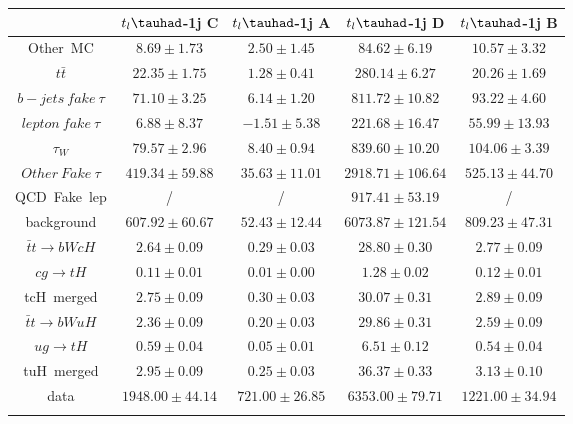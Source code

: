 \centering
\begin{tabular}{ccccc} \toprule\toprule
 & $t_{l}\tauhad$-1j C & $t_{l}\tauhad$-1j A & $t_{l}\tauhad$-1j D & $t_{l}\tauhad$-1j B\\\midrule
Other~MC & $8.69\pm1.73$ & $2.50\pm1.45$ & $84.62\pm6.19$ & $10.57\pm3.32$\\
$t\bar{t}$ & $22.35\pm1.75$ & $1.28\pm0.41$ & $280.14\pm6.27$ & $20.26\pm1.69$\\
$b-jets~fake~\tau$ & $71.10\pm3.25$ & $6.14\pm1.20$ & $811.72\pm10.82$ & $93.22\pm4.60$\\
$lepton~fake~\tau$ & $6.88\pm8.37$ & $-1.51\pm5.38$ & $221.68\pm16.47$ & $55.99\pm13.93$\\
$\tau_{W}$ & $79.57\pm2.96$ & $8.40\pm0.94$ & $839.60\pm10.20$ & $104.06\pm3.39$\\
$Other~Fake~\tau$ & $419.34\pm59.88$ & $35.63\pm11.01$ & $2918.71\pm106.64$ & $525.13\pm44.70$\\
QCD~Fake~lep &  / &  / & $917.41\pm53.19$ &  /\\
background & $607.92\pm60.67$ & $52.43\pm12.44$ & $6073.87\pm121.54$ & $809.23\pm47.31$\\\midrule
$\bar{t}t\to bWcH$ & $2.64\pm0.09$ & $0.29\pm0.03$ & $28.80\pm0.30$ & $2.77\pm0.09$\\
$cg\to tH$ & $0.11\pm0.01$ & $0.01\pm0.00$ & $1.28\pm0.02$ & $0.12\pm0.01$\\
tcH~merged & $2.75\pm0.09$ & $0.30\pm0.03$ & $30.07\pm0.31$ & $2.89\pm0.09$\\
$\bar{t}t\to bWuH$ & $2.36\pm0.09$ & $0.20\pm0.03$ & $29.86\pm0.31$ & $2.59\pm0.09$\\
$ug\to tH$ & $0.59\pm0.04$ & $0.05\pm0.01$ & $6.51\pm0.12$ & $0.54\pm0.04$\\
tuH~merged & $2.95\pm0.09$ & $0.25\pm0.03$ & $36.37\pm0.33$ & $3.13\pm0.10$\\\midrule
data & $1948.00\pm44.14$ & $721.00\pm26.85$ & $6353.00\pm79.71$ & $1221.00\pm34.94$\\
\bottomrule\bottomrule\\
\end{tabular}

